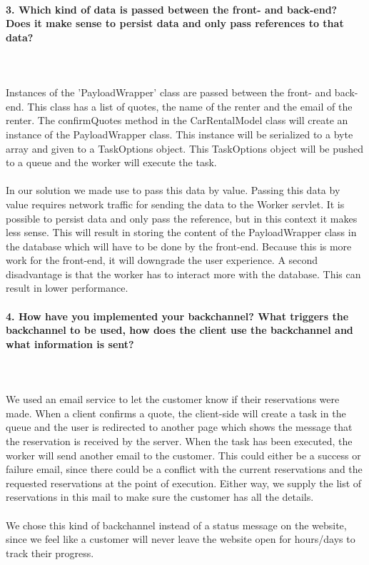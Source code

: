 \documentclass{ds-report}
\begin{document}
	\paragraph{3. Which kind of data is passed between the front- and back-end? Does it make sense to persist data and only pass references to that data?} \mbox{}\\\\
Instances of the 'PayloadWrapper' class are passed between the front- and back-end. This class has a list of quotes, the name of the renter and the email of the renter. The confirmQuotes method in the CarRentalModel class will create an instance of the PayloadWrapper class. This instance will be serialized to a byte array and given to a TaskOptions object. This TaskOptions object will be pushed to a queue and the worker will execute the task.\\\\
In our solution we made use to pass this data by value. Passing this data by value requires network traffic for sending the data to the Worker servlet. It is possible to persist data and only pass the reference, but in this context it makes less sense. This will result in storing the content of the PayloadWrapper class in the database which will have to be done by the front-end. Because this is more work for the front-end, it will downgrade the user experience. A second disadvantage is that the worker has to interact more with the database. This can result in lower performance.
\clearpage



	\paragraph{4. How have you implemented your backchannel? What triggers the backchannel to be used, how does the client use the backchannel and what information is sent?} \mbox{}\\\\
We used an email service to let the customer know if their reservations were made. When a client confirms a quote, the client-side will create a task in the queue and the user is redirected to another page which shows the message that the reservation is received by the server. When the task has been executed, the worker will send another email to the customer. This could either be a success or failure email, since there could be a conflict with the current reservations and the requested reservations at the point of execution. Either way, we supply the list of reservations in this mail to make sure the customer has all the details.\mbox{}\\\\
We chose this kind of backchannel instead of a status message on the website, since we feel like a customer will never leave the website open for hours/days to track their progress.
\end{document}

